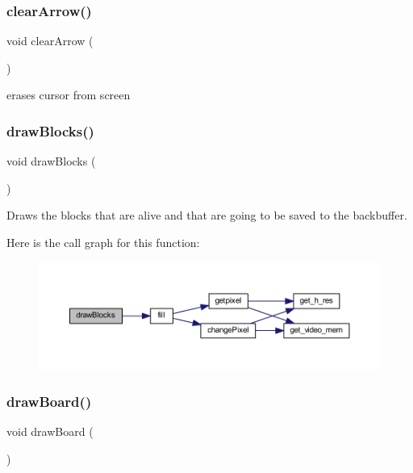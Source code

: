 \subsubsection{\texorpdfstring{clearArrow()}{clearArrow()}}
{\footnotesize\ttfamily void clear\+Arrow (\begin{DoxyParamCaption}{ }\end{DoxyParamCaption})}



erases cursor from screen 

\mbox{\label{group__game_ga172749cfe0f9091767c74e3004188ffc}} 
\subsubsection{\texorpdfstring{drawBlocks()}{drawBlocks()}}
{\footnotesize\ttfamily void draw\+Blocks (\begin{DoxyParamCaption}{ }\end{DoxyParamCaption})}



Draws the blocks that are alive and that are going to be saved to the backbuffer. 

Here is the call graph for this function\+:
\nopagebreak
\begin{figure}[H]
\begin{center}
\leavevmode
\includegraphics[width=350pt]{group__game_ga172749cfe0f9091767c74e3004188ffc_cgraph}
\end{center}
\end{figure}
\mbox{\label{group__game_ga435ba4a0d4fc47fbf7b4e13acaa312e4}} 
\subsubsection{\texorpdfstring{drawBoard()}{drawBoard()}}
{\footnotesize\ttfamily void draw\+Board (\begin{DoxyParamCaption}{ }\end{DoxyParamCaption})}




